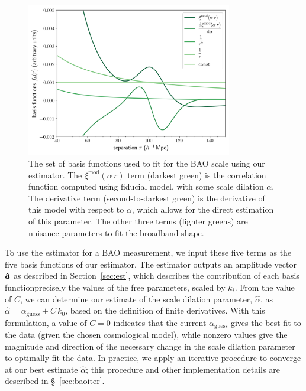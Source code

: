 \begin{figure}%
    \centering
    \includegraphics[width=0.8\textwidth]{bao_bases}
    \caption{The set of basis functions used to fit for the BAO scale using our estimator. The $\xi^\mathrm{mod}(\alpha\,r)$ term (darkest green) is the correlation function computed using fiducial model, with some scale dilation $\alpha$. The derivative term (second-to-darkest green) is the derivative of this model with respect to $\alpha$, which allows for the direct estimation of this parameter. The other three terms (lighter greens) are nuisance parameters to fit the broadband shape.}
    \label{fig:bao_bases}
\end{figure}

To use the estimator for a BAO measurement, we input these five terms as the five basis functions of our estimator.
The estimator outputs an amplitude vector $\bm{\hat a}$ as described in Section~\ref{sec:est}, which describes the contribution of each basis function{\emdash}precisely the values of the free parameters, scaled by $k_i$.
From the value of $C$, we can determine our estimate of the scale dilation parameter, $\hat{\alpha}$, as $\hat{\alpha} = \alpha_\mathrm{guess} + C\,k_0$, based on the definition of finite derivatives. 
With this formulation, a value of $C=0$ indicates that the current $\alpha_\mathrm{guess}$ gives the best fit to the data (given the chosen cosmological model), while nonzero values give the magnitude and direction of the necessary change in the scale dilation parameter to optimally fit the data.
In practice, we apply an iterative procedure to converge at our best estimate $\hat{\alpha}$; this procedure and other implementation details are described in \S~\ref{sec:baoiter}.

